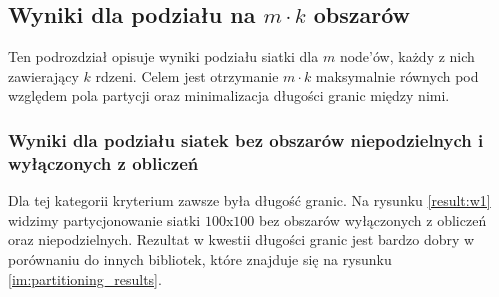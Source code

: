 \subsection{Wyniki dla podziału na $m \cdot k$ obszarów}

Ten podrozdział opisuje wyniki podziału siatki dla $m$ node'ów, każdy z nich zawierający $k$ rdzeni.
Celem jest otrzymanie $m \cdot k$ maksymalnie równych pod względem pola partycji oraz minimalizacja długości granic
między nimi.
\subsubsection{Wyniki dla podziału siatek bez obszarów niepodzielnych i wyłączonych z obliczeń}
Dla tej kategorii kryterium zawsze była długość granic.
Na rysunku \ref{result:w1} widzimy partycjonowanie siatki $100$x$100$ bez obszarów wyłączonych z obliczeń oraz
niepodzielnych.
Rezultat w kwestii długości granic jest bardzo dobry w porównaniu do innych bibliotek, które znajduje się na rysunku
\ref{im:partitioning_results}.
